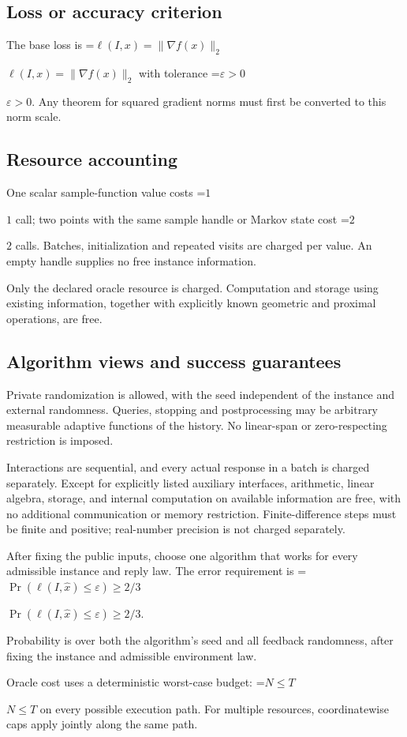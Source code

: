 \documentclass[10pt,a4paper]{article}
\newcommand{\AtlasMath}[1]{\par\begingroup\centering\setbox0=\hbox{$\displaystyle #1$}\ifdim\wd0>1.4\linewidth\typeout{ATLAS WIDE FORMULA: \the\wd0}\fi\ifdim\wd0>\linewidth\resizebox{\linewidth}{!}{\box0}\else\box0\fi\par\endgroup}
\newcommand{\AtlasInlineMath}[1]{\begingroup\setbox0=\hbox{$#1$}\ifdim\wd0>.4\linewidth\endgroup\AtlasMath{#1}\else\endgroup$#1$\fi}
\begin{document}
\subsection{Loss or accuracy criterion}
The base loss is \AtlasInlineMath{\ell(I,x)=\|\nabla f(x)\|_2} with tolerance \AtlasInlineMath{\varepsilon>0}. Any theorem for squared gradient norms must first be converted to this norm scale.

\subsection{Resource accounting}
One scalar sample-function value costs \AtlasInlineMath{1} call; two points with the same sample handle or Markov state cost \AtlasInlineMath{2} calls. Batches, initialization and repeated visits are charged per value. An empty handle supplies no free instance information.

Only the declared oracle resource is charged. Computation and storage using existing information, together with explicitly known geometric and proximal operations, are free.

\subsection{Algorithm views and success guarantees}
Private randomization is allowed, with the seed independent of the instance and external randomness. Queries, stopping and postprocessing may be arbitrary measurable adaptive functions of the history. No linear-span or zero-respecting restriction is imposed.

Interactions are sequential, and every actual response in a batch is charged separately. Except for explicitly listed auxiliary interfaces, arithmetic, linear algebra, storage, and internal computation on available information are free, with no additional communication or memory restriction. Finite-difference steps must be finite and positive; real-number precision is not charged separately.

After fixing the public inputs, choose one algorithm that works for every admissible instance and reply law. The error requirement is \AtlasInlineMath{\Pr(\ell(I,\widehat{x})\le \varepsilon)\ge2/3}.

Probability is over both the algorithm's seed and all feedback randomness, after fixing the instance and admissible environment law.

Oracle cost uses a deterministic worst-case budget: \AtlasInlineMath{N\le T} on every possible execution path. For multiple resources, coordinatewise caps apply jointly along the same path.
\end{document}
